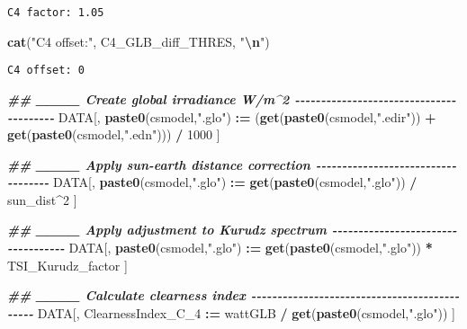 \documentclass[
  10pt,
  a4paper,oneside]{article}
\newenvironment{Shaded}{\begin{snugshade}}{\end{snugshade}}
\newcommand{\DecValTok}[1]{\textcolor[rgb]{0.00,0.00,0.81}{#1}}
\newcommand{\DocumentationTok}[1]{\textcolor[rgb]{0.56,0.35,0.01}{\textbf{\textit{#1}}}}
\newcommand{\FunctionTok}[1]{\textcolor[rgb]{0.13,0.29,0.53}{\textbf{#1}}}
\newcommand{\NormalTok}[1]{#1}
\newcommand{\SpecialCharTok}[1]{\textcolor[rgb]{0.81,0.36,0.00}{\textbf{#1}}}
\newcommand{\StringTok}[1]{\textcolor[rgb]{0.31,0.60,0.02}{#1}}
\begin{document}
\begin{verbatim}
C4 factor: 1.05 
\end{verbatim}

\begin{Shaded}
\begin{Highlighting}[]
\FunctionTok{cat}\NormalTok{(}\StringTok{"C4 offset:"}\NormalTok{, C4\_GLB\_diff\_THRES, }\StringTok{"}\SpecialCharTok{\textbackslash{}n}\StringTok{"}\NormalTok{)}
\end{Highlighting}
\end{Shaded}

\begin{verbatim}
C4 offset: 0 
\end{verbatim}

\begin{Shaded}
\begin{Highlighting}[]
\DocumentationTok{\#\# \_\_\_\_ Create global irradiance W/m\^{}2  {-}{-}{-}{-}{-}{-}{-}{-}{-}{-}{-}{-}{-}{-}{-}{-}{-}{-}{-}{-}{-}{-}{-}{-}{-}{-}{-}{-}{-}{-}{-}{-}{-}{-}{-}{-}{-}{-}{-}{-}}
\NormalTok{DATA[, }\FunctionTok{paste0}\NormalTok{(csmodel,}\StringTok{".glo"}\NormalTok{) }\SpecialCharTok{:=}\NormalTok{ (}\FunctionTok{get}\NormalTok{(}\FunctionTok{paste0}\NormalTok{(csmodel,}\StringTok{".edir"}\NormalTok{)) }\SpecialCharTok{+} \FunctionTok{get}\NormalTok{(}\FunctionTok{paste0}\NormalTok{(csmodel,}\StringTok{".edn"}\NormalTok{))) }\SpecialCharTok{/} \DecValTok{1000}\NormalTok{ ]}


\DocumentationTok{\#\# \_\_\_\_ Apply sun{-}earth distance correction  {-}{-}{-}{-}{-}{-}{-}{-}{-}{-}{-}{-}{-}{-}{-}{-}{-}{-}{-}{-}{-}{-}{-}{-}{-}{-}{-}{-}{-}{-}{-}{-}{-}{-}{-}}
\NormalTok{DATA[, }\FunctionTok{paste0}\NormalTok{(csmodel,}\StringTok{".glo"}\NormalTok{) }\SpecialCharTok{:=} \FunctionTok{get}\NormalTok{(}\FunctionTok{paste0}\NormalTok{(csmodel,}\StringTok{".glo"}\NormalTok{)) }\SpecialCharTok{/}\NormalTok{ sun\_dist}\SpecialCharTok{\^{}}\DecValTok{2}\NormalTok{ ]}


\DocumentationTok{\#\# \_\_\_\_ Apply adjustment to Kurudz spectrum  {-}{-}{-}{-}{-}{-}{-}{-}{-}{-}{-}{-}{-}{-}{-}{-}{-}{-}{-}{-}{-}{-}{-}{-}{-}{-}{-}{-}{-}{-}{-}{-}{-}{-}{-}}
\NormalTok{DATA[, }\FunctionTok{paste0}\NormalTok{(csmodel,}\StringTok{".glo"}\NormalTok{) }\SpecialCharTok{:=} \FunctionTok{get}\NormalTok{(}\FunctionTok{paste0}\NormalTok{(csmodel,}\StringTok{".glo"}\NormalTok{)) }\SpecialCharTok{*}\NormalTok{ TSI\_Kurudz\_factor ]}


\DocumentationTok{\#\# \_\_\_\_ Calculate clearness index  {-}{-}{-}{-}{-}{-}{-}{-}{-}{-}{-}{-}{-}{-}{-}{-}{-}{-}{-}{-}{-}{-}{-}{-}{-}{-}{-}{-}{-}{-}{-}{-}{-}{-}{-}{-}{-}{-}{-}{-}{-}{-}{-}{-}{-}}
\NormalTok{DATA[, ClearnessIndex\_C\_4 }\SpecialCharTok{:=}\NormalTok{ wattGLB }\SpecialCharTok{/} \FunctionTok{get}\NormalTok{(}\FunctionTok{paste0}\NormalTok{(csmodel,}\StringTok{".glo"}\NormalTok{)) ]}


\end{Highlighting}
\end{Shaded}
\end{document}
